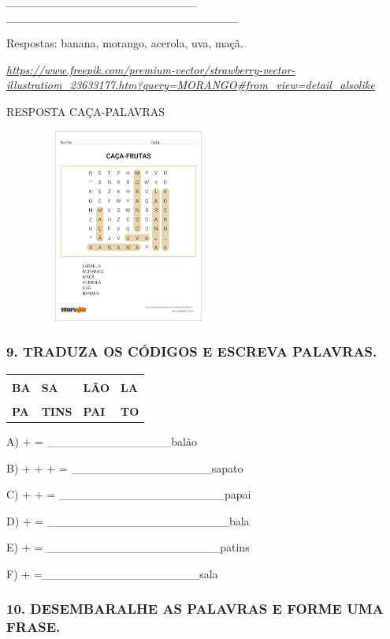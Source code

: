 \_\_\_\_\_\_\_\_\_\_\_\_\_\_\_\_\_\_\_\_\_\_\_
\_\_\_\_\_\_\_\_\_\_\_\_\_\_\_\_\_\_\_\_\_\_\_\_\_\_\_\_

Respostas: banana, morango, acerola, uva, maçã.

\href{https://www.freepik.com/premium-vector/strawberry-vector-illustratiom_23633177.htm?query=MORANGO\#from_view=detail_alsolike}{\emph{https://www.freepik.com/premium-vector/strawberry-vector-illustratiom\_23633177.htm?query=MORANGO\#from\_view=detail\_alsolike}}

RESPOSTA CAÇA-PALAVRAS

\includegraphics[width=3.23199in,height=2.51443in]{media/image104.jpg}

\subsubsection{9. TRADUZA OS CÓDIGOS E ESCREVA
PALAVRAS.}\label{traduza-os-cuxf3digos-e-escreva-palavras.}

\begin{longtable}[]{@{}llll@{}}
\toprule
& & &\tabularnewline
\textbf{BA} & \textbf{SA} & \textbf{LÃO} & \textbf{LA}\tabularnewline
& & &\tabularnewline
\textbf{PA} & \textbf{TINS} & \textbf{PAI} & \textbf{TO}\tabularnewline
\bottomrule
\end{longtable}

A) + = \_\_\_\_\_\_\_\_\_\_\_\_\_\_\_balão

B) + + + = \_\_\_\_\_\_\_\_\_\_\_\_\_\_\_\_\_sapato

C) + + = \_\_\_\_\_\_\_\_\_\_\_\_\_\_\_\_\_\_\_\_papai

D) + = \_\_\_\_\_\_\_\_\_\_\_\_\_\_\_\_\_\_\_\_\_\_bala

E) + = \_\_\_\_\_\_\_\_\_\_\_\_\_\_\_\_\_\_\_\_\_patins

F) + =\_\_\_\_\_\_\_\_\_\_\_\_\_\_\_\_\_\_\_sala

\subsubsection{10. DESEMBARALHE AS PALAVRAS E FORME UMA
FRASE.}\label{desembaralhe-as-palavras-e-forme-uma-frase.}


